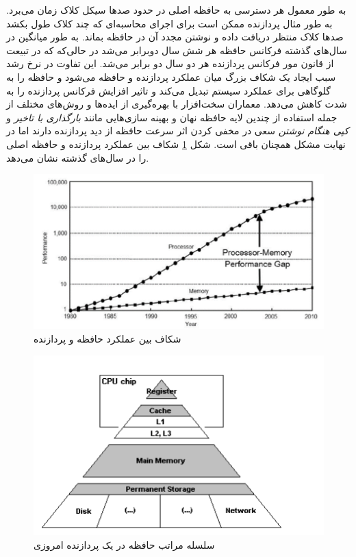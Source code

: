 \documentclass{thesis}
\begin{document}
به طور معمول هر دسترسی به حافظه اصلی
در حدود صدها سیکل کلاک زمان می‌برد. به طور مثال پردازنده ممکن است برای اجرای
محاسبه‌ای که چند کلاک طول بکشد صدها کلاک منتظر دریافت داده و نوشتن مجدد آن در
حافظه بماند. به طور میانگین در سال‌های گذشته فرکانس حافظه هر 
شش سال دوبرابر می‌شد در حالی‌که که در تبیعت از قانون مور فرکانس پردازنده هر
دو سال دو برابر می‌شد. این تفاوت در نرخ رشد سبب ایجاد یک شکاف بزرگ میان عملکرد
پردازنده و حافظه می‌شود و حافظه را به گلوگاهی
برای عملکرد سیستم تبدیل می‌کند و تاثیر افزایش فرکانس پردازنده را به شدت کاهش
می‌دهد. معماران سخت‌افزار با بهره‌گیری از ایده‌ها و روش‌های مختلف از جمله 
استفاده از چندین
لایه حافظه نهان و بهینه سازی‌هایی مانند 
\textit{%
بارگذاری با تاخیر
}
و 
\textit{
کپی هنگام نوشتن
}
سعی در مخفی کردن اثر سرعت حافظه از دید پردازنده دارند اما در نهایت مشکل همچنان
باقی است.
شکل
\ref{memorygap}
شکاف بین عملکرد پردازنده و حافظه اصلی را در سال‌های گذشته نشان می‌دهد.

\begin{figure}[h]
\centering
\includegraphics[width=\textwidth]{./pics/3}
\caption{شکاف بین عملکرد حافظه و پردازنده}
\label{memorygap}
\end{figure}

\begin{figure}[h]
\centering
\includegraphics[width=\textwidth]{./pics/4}
\caption{سلسله مراتب حافظه در یک پردازنده امروزی}
\label{memoryhierarchy}
\end{figure}
\end{document}
